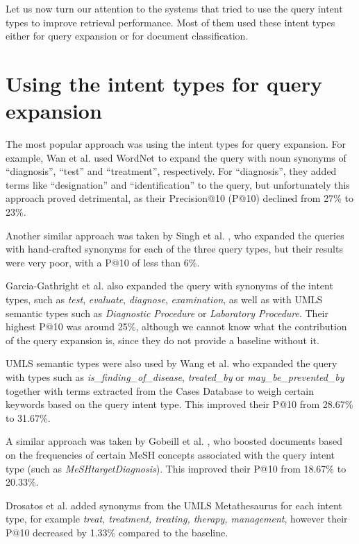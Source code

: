 Let us now turn our attention to the systems that tried to use the query intent types to improve retrieval performance.
Most of them used these intent types either for query expansion or for document classification.

\section{Using the intent types for query expansion}

The most popular approach was using the intent types for query expansion. 
For example, Wan et al. \cite{cuhk} used WordNet to expand the query with noun synonyms
of ``diagnosis'', ``test'' and ``treatment'', respectively. For ``diagnosis'', they added terms like ``designation''
and ``identification'' to the query, but unfortunately this approach proved detrimental, as their Precision@10
(P@10) declined from 27\% to 23\%.

Another similar approach was taken by Singh et al. \cite{CSEIITV}, who expanded the queries with hand-crafted synonyms
for each of the three query types, but their results were very poor, with a P@10 of less than 6\%.

Garcia-Gathright et al. \cite{ucla} also expanded the query with synonyms of the intent types, such as \emph{test}, \emph{evaluate},
\emph{diagnose}, \emph{examination}, as well as with UMLS semantic types such as \emph{Diagnostic Procedure}
or \emph{Laboratory Procedure}. Their highest P@10 was around 25\%, although we cannot know what the contribution
of the query expansion is, since they do not provide a baseline without it.

UMLS semantic types were also used by Wang et al. \cite{udel} who expanded the query
with types such as \emph{is\_finding\_of\_disease}, \emph{treated\_by} or
\emph{may\_be\_prevented\_by} together with terms extracted from the Cases Database to weigh certain keywords
based on the query intent type. This improved their P@10 from 28.67\% to 31.67\%. 

A similar approach was taken by Gobeill et al. \cite{bitem}, who boosted documents based on the 
frequencies of certain MeSH
concepts associated with the query intent type (such as \emph{MeSHtargetDiagnosis}). This improved their P@10
from 18.67\% to 20.33\%.

Drosatos et al. \cite{duth} added synonyms from the UMLS Metathesaurus for each intent type, for example
\emph{treat, treatment, treating, therapy, management}, however their P@10 decreased by 1.33\% compared to the baseline.

